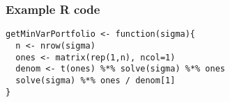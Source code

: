 \documentclass{beamer}
\begin{document}

\begin{frame}[fragile]
\frametitle{Example R code}

\begin{verbatim}
getMinVarPortfolio <- function(sigma){
  n <- nrow(sigma)
  ones <- matrix(rep(1,n), ncol=1)
  denom <- t(ones) %*% solve(sigma) %*% ones
  solve(sigma) %*% ones / denom[1]
}
\end{verbatim}

\end{frame}
\end{document}

